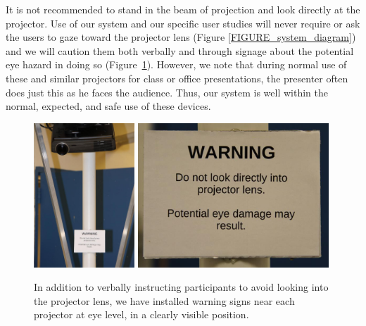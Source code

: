 \documentclass[10pt]{article}
\begin{document}
It is not recommended to stand in the beam of projection and look
directly at the projector.  Use of our system and our specific user
studies will never require or ask the users to gaze toward the
projector lens (Figure \ref{FIGURE_system_diagram}) and we will
caution them both verbally and through signage about the potential
eye hazard in doing so (Figure~\ref{FIGURE_warning_signs}).  However,
we note that during normal use of these and similar projectors for
class or office presentations, the presenter often does just this as
he faces the audience.  Thus, our system is well within the normal,
expected, and safe use of these devices.


\begin{figure}[t]
  \begin{center}
    \includegraphics[width=0.3379\textwidth]{images/img_1193_small2.jpg}
    \includegraphics[width=0.64\textwidth]{images/img_1194_small2.jpg}
  \end{center}
  \caption{In addition to verbally instructing participants to avoid
    looking into the projector lens, we have installed warning signs
    near each projector at eye level, in a clearly visible position.
\label{FIGURE_warning_signs}
}
\end{figure}
\end{document}
